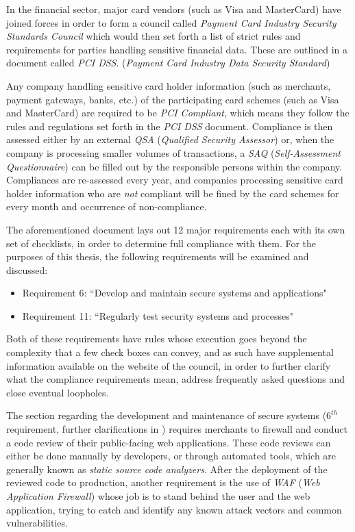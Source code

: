 \documentclass[a4paper,12pt]{article}
\begin{document}
	In the financial sector, major card vendors (such as Visa and MasterCard) have joined forces in order to form a council called \textit{Payment Card Industry Security Standards Council} which would then set forth a list of strict rules and requirements for parties handling sensitive financial data. These are outlined in a document called \textit{PCI DSS}. (\textit{Payment Card Industry Data Security Standard})
	
	Any company handling sensitive card holder information (such as merchants, payment gateways, banks, etc.) of the participating card schemes (such as Visa and MasterCard) are required to be \textit{PCI Compliant}, which means they follow the rules and regulations set forth in the \textit{PCI DSS} document. Compliance is then assessed either by an external \textit{QSA} (\textit{Qualified Security Assessor}) or, when the company is processing smaller volumes of transactions, a \textit{SAQ} (\textit{Self-Assessment Questionnaire}) can be filled out by the responsible persons within the company. Compliances are re-assessed every year, and companies processing sensitive card holder information who are \textit{not} compliant will be fined by the card schemes for every month and occurrence of non-compliance.\cite{wfargo15}
	
	The aforementioned document lays out 12 major requirements\cite{pcidss31} each with its own set of checklists, in order to determine full compliance with them. For the purposes of this thesis, the following requirements will be examined and discussed:
	
	\begin{itemize}
		\item Requirement 6: ``Develop and maintain secure systems and applications"
		\item Requirement 11: ``Regularly test security systems and processes"
	\end{itemize}
	
	Both of these requirements have rules whose execution goes beyond the complexity that a few check boxes can convey, and as such have supplemental information available on the website of the council, in order to further clarify what the compliance requirements mean, address frequently asked questions and close eventual loopholes.
	
	The section regarding the development and maintenance of secure systems ($6^{th}$ requirement, further clarifications in \cite{pcireq6}) requires merchants to firewall and conduct a code review of their public-facing web applications. These code reviews can either be done manually by developers, or through automated tools, which are generally known as \textit{static source code analyzers}. After the deployment of the reviewed code to production, another requirement is the use of \textit{WAF} (\textit{Web Application Firewall}) whose job is to stand behind the user and the web application, trying to catch and identify any known attack vectors and common vulnerabilities.
	
\end{document}
